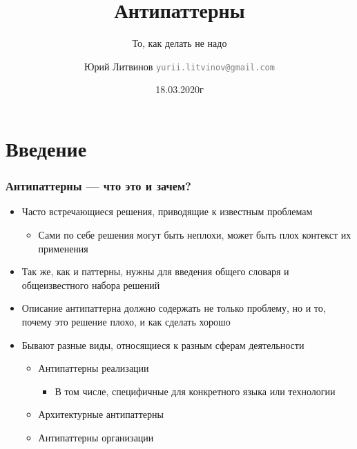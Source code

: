 \documentclass[xetex,mathserif,serif]{beamer}
\title{Антипаттерны}
\subtitle{То, как делать не надо}
\author[Юрий Литвинов]{Юрий Литвинов \newline \textcolor{gray}{\small\texttt{yurii.litvinov@gmail.com}}}
\date{18.03.2020г}
\begin{document}
	
	\frame{\titlepage}

	\section{Введение}

	\begin{frame}
		\frametitle{Антипаттерны --- что это и зачем?}
		\begin{itemize}
			\item Часто встречающиеся решения, приводящие к известным проблемам
			\begin{itemize}
				\item Сами по себе решения могут быть неплохи, может быть плох контекст их применения
			\end{itemize}
			\item Так же, как и паттерны, нужны для введения общего словаря и общеизвестного набора решений
			\item Описание антипаттерна должно содержать не только проблему, но и то, почему это решение плохо, и как сделать хорошо
			\item Бывают разные виды, относящиеся к разным сферам деятельности
			\begin{itemize}
				\item Антипаттерны реализации
				\begin{itemize}
					\item В том числе, специфичные для конкретного языка или технологии
				\end{itemize}
				\item Архитектурные антипаттерны
				\item Антипаттерны организации
			\end{itemize}
		\end{itemize}
	\end{frame}
\end{document}
